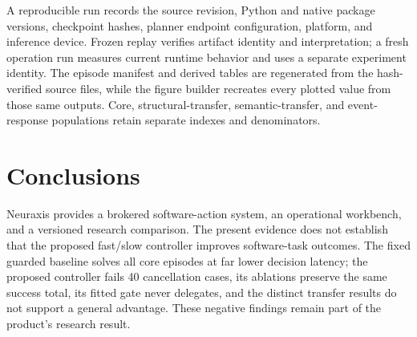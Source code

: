 \documentclass[11pt]{article}
\begin{document}
A reproducible run records the source revision, Python and native package versions, checkpoint hashes, planner endpoint configuration, platform, and inference device. Frozen replay verifies artifact identity and interpretation; a fresh operation run measures current runtime behavior and uses a separate experiment identity. The episode manifest and derived tables are regenerated from the hash-verified source files, while the figure builder recreates every plotted value from those same outputs. Core, structural-transfer, semantic-transfer, and event-response populations retain separate indexes and denominators.
\section{Conclusions}

Neuraxis provides a brokered software-action system, an operational workbench, and a versioned research comparison. The present evidence does not establish that the proposed fast/slow controller improves software-task outcomes. The fixed guarded baseline solves all core episodes at far lower decision latency; the proposed controller fails 40 cancellation cases, its ablations preserve the same success total, its fitted gate never delegates, and the distinct transfer results do not support a general advantage. These negative findings remain part of the product's research result.
\end{document}
